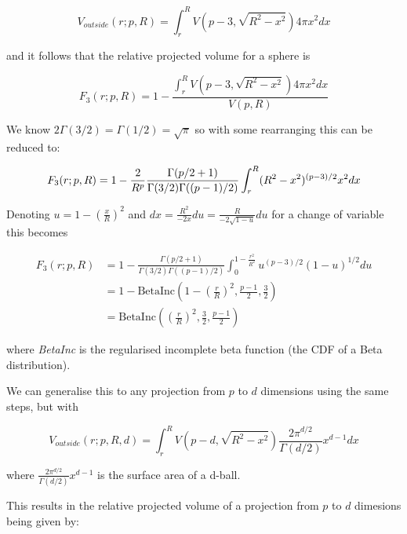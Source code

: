\begin{equation}
  V_{outside}(r; p, R) = \int_r^R V(p-3, \sqrt{R^2 - x^2})4\pi x^2 dx
\end{equation}

and it follows that the relative projected volume for a sphere is

\begin{equation}
  F_3(r; p, R) = 1 - 
  \frac{
      \int_r^R V(p-3, \sqrt{R^2 - x^2})4\pi x^2 dx
  }{
      V(p, R)
  } 
\end{equation}

We know \(2\Gamma(3/2) = \Gamma(1/2) = \sqrt{ \pi }\) so with some
rearranging this can be reduced to:

\begin{equation}
  F_3(r; p, R) = 1 - \frac{2}{R^p} \frac{\Gamma(p/2+1)}{\Gamma(3/2)\Gamma((p-1)/2)}
  \int_r^R (R^2 - x^2)^{(p-3)/2} x^2 dx \\
\end{equation}

Denoting \(u = 1 - \left(\frac{x}{R}\right)^2\) and
\(dx = \frac{R^2}{-2x}du = \frac{R}{-2\sqrt{1-u}}du\) for a change of
variable this becomes

\begin{align}
  F_3(r; p, R) &= 1 - \frac{\Gamma(p/2+1)}{\Gamma(3/2)\Gamma((p-1)/2)}
  \int_0^{1-\frac{r^2}{R^2}} u^{(p-3)/2} (1-u)^{1/2} du \\
  &= 1 - \mathrm{BetaInc}\left(1-\left(\frac{r}{R}\right)^2, \frac{p-1}{2}, \frac{3}{2}\right) \\
  &= \mathrm{BetaInc}\left(\left(\frac{r}{R}\right)^2, \frac{3}{2}, \frac{p-1}{2}\right) 
  \label{eq:betainc1}
\end{align}

where \emph{BetaInc} is the regularised incomplete beta function (the
CDF of a Beta distribution).

We can generalise this to any projection from \(p\) to \(d\) dimensions
using the same steps, but with

\begin{equation}
  V_{outside}(r; p, R, d) = \int_r^R V(p-d, \sqrt{R^2 - x^2}) 
  \frac{2\pi^{d/2}}{\Gamma(d/2)} x^{d-1} dx
\end{equation}

where \(\frac{2\pi^{d/2}}{\Gamma(d/2)} x^{d-1}\) is the surface area of
a d-ball.

This results in the relative projected volume of a projection from \(p\)
to \(d\) dimesions being given by:

